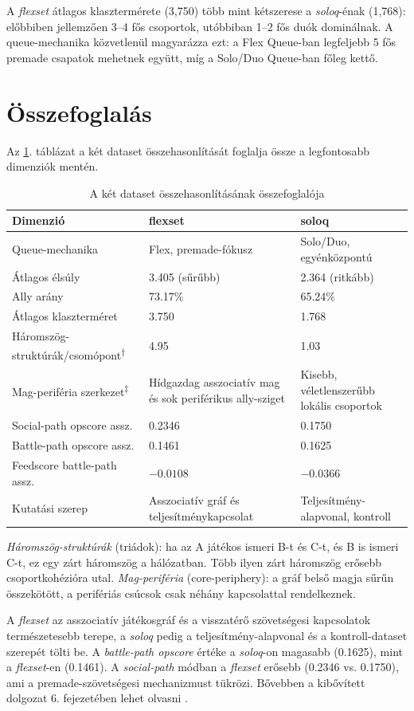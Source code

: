A \textit{flexset} átlagos klasztermérete (3,750) több mint kétszerese a \textit{soloq}-énak (1,768): előbbiben jellemzően 3--4 fős csoportok, utóbbiban 1--2 fős duók dominálnak. A queue-mechanika közvetlenül magyarázza ezt: a Flex Queue-ban legfeljebb 5 fős premade csapatok mehetnek együtt, míg a Solo/Duo Queue-ban főleg kettő.

\section{Összefoglalás}

Az \ref{tab:dataset-summary}. táblázat a két dataset összehasonlítását foglalja össze a legfontosabb dimenziók mentén.

\begin{table}[H]
\centering
\caption{A két dataset összehasonlításának összefoglalója}
\label{tab:dataset-summary}
\begin{tabularx}{\textwidth}{|>{\raggedright\arraybackslash}p{5cm}|X|X|}
\hline
\textbf{Dimenzió} & \textbf{flexset} & \textbf{soloq} \\
\hline
Queue-mechanika & Flex, premade-fókusz & Solo/Duo, egyénközpontú \\
Átlagos élsúly & 3.405 (sűrűbb) & 2.364 (ritkább) \\
Ally arány & 73.17\% & 65.24\% \\
Átlagos klaszterméret & 3.750 & 1.768 \\
Háromszög-struktúrák/csomópont\textsuperscript{†} & 4.95 & 1.03 \\
Mag-periféria szerkezet\textsuperscript{‡} & Hídgazdag asszociatív mag és sok periférikus ally-sziget & Kisebb, véletlenszerűbb lokális csoportok \\
Social-path opscore assz. & 0.2346 & 0.1750 \\
Battle-path opscore assz. & 0.1461 & 0.1625 \\
Feedscore battle-path assz. & $-0.0108$ & $-0.0366$ \\
Kutatási szerep & Asszociatív gráf és teljesítménykapcsolat & Teljesítmény-alapvonal, kontroll \\
\hline
\end{tabularx}
\end{table}

\noindent\small{\textit{Háromszög-struktúrák} (triádok): ha az A játékos ismeri B-t és C-t, és B is ismeri C-t, ez egy zárt háromszög a hálózatban. Több ilyen zárt háromszög erősebb csoportkohézióra utal. \textit{Mag-periféria} (core-periphery): a gráf belső magja sűrűn összekötött, a perifériás csúcsok csak néhány kapcsolattal rendelkeznek.}\normalsize

\medskip
A \textit{flexset} az asszociatív játékosgráf és a visszatérő szövetségesi kapcsolatok természetesebb terepe, a \textit{soloq} pedig a teljesítmény-alapvonal és a kontroll-dataset szerepét tölti be. A \textit{battle-path opscore} értéke a \textit{soloq}-on magasabb (0.1625), mint a \textit{flexset}-en (0.1461). A \textit{social-path} módban a \textit{flexset} erősebb (0.2346 vs. 0.1750), ami a premade-szövetségesi mechanizmust tükrözi. Bővebben a kibővített dolgozat 6. fejezetében lehet olvasni \cite{premadegraph-full}.
